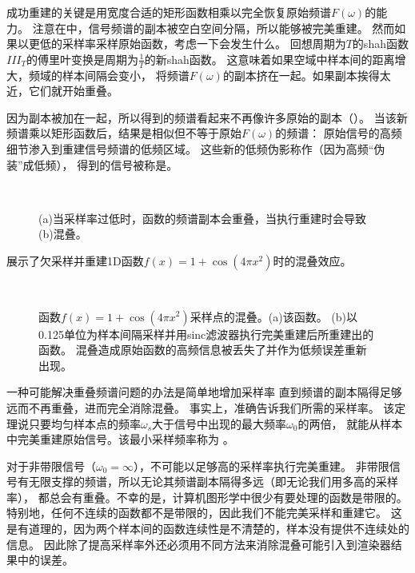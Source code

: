 成功重建的关键是用宽度合适的矩形函数相乘以完全恢复原始频谱$F(\omega)$的能力。
注意在中，信号频谱的副本被空白空间分隔，所以能够被完美重建。
然而如果以更低的采样率采样原始函数，考虑一下会发生什么。
回想周期为$T$的shah函数$III_T$的傅里叶变换是周期为$\displaystyle\frac{1}{T}$的新shah函数。
这意味着如果空域中样本间的距离增大，频域的样本间隔会变小，
将频谱$F(\omega)$的副本挤在一起。如果副本挨得太近，它们就开始重叠。

因为副本被加在一起，所以得到的频谱看起来不再像许多原始的副本（）。
当该新频谱乘以矩形函数后，结果是相似但不等于原始$F(\omega)$的频谱：
原始信号的高频细节渗入到重建信号频谱的低频区域。
这些新的低频伪影称作（因为高频“伪装”成低频），
得到的信号被称是。
\begin{figure}
    \centering
    \,
    \caption{(a)当采样率过低时，函数的频谱副本会重叠，当执行重建时会导致(b)混叠。}
    \label{fig:7.8}
\end{figure}

展示了欠采样并重建1D函数$f(x)=1+\cos(4\pi x^2)$时的混叠效应。
\begin{figure}[htbp]
    \centering
    \,
    \caption{函数$f(x)=1+\cos(4\pi x^2)$采样点的混叠。(a)该函数。
        (b)以0.125单位为样本间隔采样并用sinc滤波器执行完美重建后所重建出的函数。
        混叠造成原始函数的高频信息被丢失了并作为低频误差重新出现。}
    \label{fig:7.9}
\end{figure}

一种可能解决重叠频谱问题的办法是简单地增加采样率
直到频谱的副本隔得足够远而不再重叠，进而完全消除混叠。
事实上，准确告诉我们所需的采样率。
该定理说只要均匀样本点的频率$\omega_s$大于信号中出现的最大频率$\omega_0$的两倍，
就能从样本中完美重建原始信号。该最小采样频率称为
。

对于非带限信号（$\omega_0=\infty$），不可能以足够高的采样率执行完美重建。
非带限信号有无限支撑的频谱，所以无论其频谱副本隔得多远（即无论我们用多高的采样率），
都总会有重叠。不幸的是，计算机图形学中很少有要处理的函数是带限的。
特别地，任何不连续的函数都不是带限的，因此我们不能完美采样和重建它。
这是有道理的，因为两个样本间的函数连续性是不清楚的，样本没有提供不连续处的信息。
因此除了提高采样率外还必须用不同方法来消除混叠可能引入到渲染器结果中的误差。

